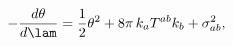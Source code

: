 \begin{equation}
-\frac{d\theta}{d\lam}=\frac{1}{2}\theta^2+ 8\pi \, k_a T^{ab}k_b + 
\sigma_{ab}^2, \label{eq:Ray} \end{equation}

